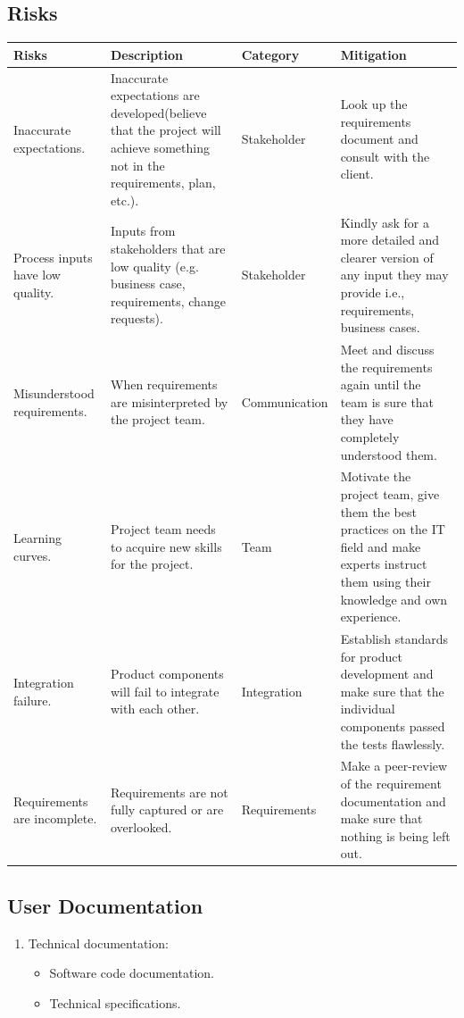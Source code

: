 \documentclass[notitlepage]{article}
\begin{document}
\begin{flushleft}
\subsection{Risks}
\newpage
\begin{tabularx}{\textwidth}{|X|X|p{3cm}|X|}
\hline
\textbf{Risks} 
&\textbf{Description}
&\textbf{Category}
&\textbf{Mitigation}\\
\hline
Inaccurate expectations. &Inaccurate expectations are developed(believe that the project will achieve something not in the requirements, plan, etc.).&Stakeholder &Look up the requirements document and consult with the client.\\
\hline
Process inputs have low quality. &Inputs from stakeholders that are low quality (e.g. business case, requirements, change requests). &Stakeholder	&Kindly ask for a more detailed and clearer version of any input they may provide i.e., requirements, business cases.\\
\hline
Misunderstood requirements.	&When requirements are misinterpreted by the project team.	&Communication &Meet and discuss the requirements again until the team is sure that they have completely understood them.\\ 
\hline
Learning curves. &Project team needs to acquire new skills for the project.	&Team	&Motivate the project team, give them the best practices on the IT field and make experts instruct them using their knowledge and own experience.\\ 
\hline
Integration failure. &Product components will fail to integrate with each other. &Integration	&Establish standards for product development and make sure that the individual components passed the tests flawlessly.\\ 
\hline
Requirements are incomplete. &Requirements are not fully captured or are overlooked.	&Requirements	&Make a peer-review of the requirement documentation and make sure that nothing is being left out.\\ 
\hline
\end{tabularx}




\subsection{User Documentation}
\begin{enumerate}
\item Technical documentation: 
\begin{itemize}
  \item Software code documentation.
  \item Technical specifications.
\end{itemize}


\end{enumerate}
\end{flushleft}
\end{document}
